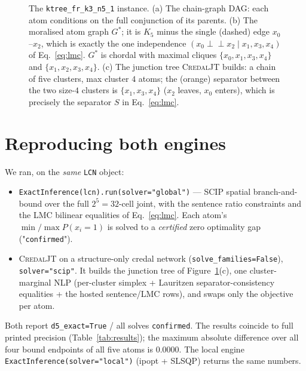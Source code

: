 \documentclass[11pt]{article}
\newcommand{\indep}{\perp\!\!\!\perp}
\begin{document}
\begin{figure}[t]
\caption{The \texttt{ktree\_fr\_k3\_n5\_1} instance. (a) The chain-graph DAG:
each atom conditions on the full conjunction of its parents.
(b) The moralised atom graph $G^\ast$; it is $K_5$ minus the single (dashed)
edge $x_0$--$x_2$, which is exactly the one independence
$(x_0\indep x_2\mid x_1,x_3,x_4)$ of Eq.~\eqref{eq:lmc}. $G^\ast$ is chordal
with maximal cliques $\{x_0,x_1,x_3,x_4\}$ and $\{x_1,x_2,x_3,x_4\}$.
(c) The junction tree \textsc{CredalJT} builds: a chain of five clusters, max
cluster $4$ atoms; the (orange) separator between the two size-$4$ clusters is
$\{x_1,x_3,x_4\}$ ($x_2$ leaves, $x_0$ enters), which is precisely the
separator $S$ in Eq.~\eqref{eq:lmc}.}
\label{fig:instance}
\end{figure}

\section{Reproducing both engines}
\label{sec:repro}

We ran, on the \emph{same} \texttt{LCN} object:
\begin{itemize}
  \item \texttt{ExactInference(lcn).run(solver="global")} --- SCIP spatial
        branch-and-bound over the full $2^5{=}32$-cell joint, with the sentence
        ratio constraints and the LMC bilinear equalities of
        Eq.~\eqref{eq:lmc}. Each atom's $\min/\max P(x_i{=}1)$ is solved to a
        \emph{certified} zero optimality gap ("\texttt{confirmed}").
  \item \textsc{CredalJT} on a structure-only credal network
        (\texttt{solve\_families=False}), \texttt{solver="scip"}. It builds the
        junction tree of Figure~\ref{fig:instance}(c), one cluster-marginal NLP
        (per-cluster simplex + Lauritzen separator-consistency equalities +
        the hosted sentence/LMC rows), and swaps only the objective per atom.
\end{itemize}
Both report \texttt{d5\_exact=True} / all solves \texttt{confirmed}. The results
coincide to full printed precision (Table~\ref{tab:results}); the maximum
absolute difference over all four bound endpoints of all five atoms is
$0.0000$. The local engine \texttt{ExactInference(solver="local")} (ipopt +
SLSQP) returns the same numbers.
\end{document}
